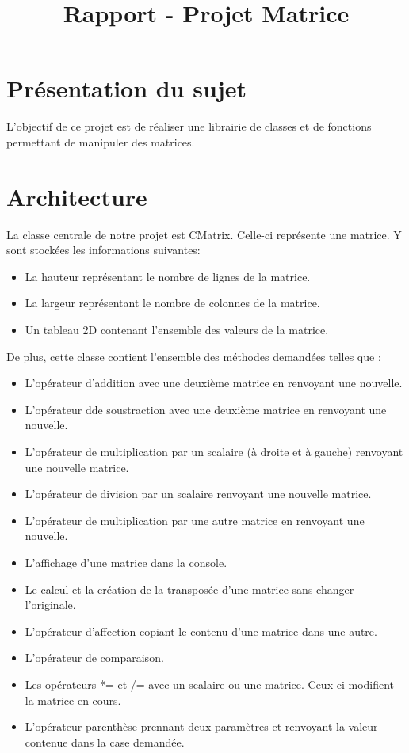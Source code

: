 
\title{Rapport - Projet Matrice}
\fancyhf{}
\lhead{\leftmark}


	\maketitle
	\tableofcontents
	\chapter{Présentation du sujet}
		L'objectif de ce projet est de réaliser une librairie de classes et de fonctions permettant de manipuler des matrices.
	
	\chapter{Architecture}
		La classe centrale de notre projet est CMatrix. Celle-ci représente une matrice. Y sont stockées les informations suivantes:
		\begin{itemize}
			\item La hauteur représentant le nombre de lignes de la matrice.
			\item La largeur représentant le nombre de colonnes de la matrice.
			\item Un tableau 2D contenant l'ensemble des valeurs de la matrice.\\
		\end{itemize}
		De plus, cette classe contient l'ensemble des méthodes demandées telles que :
		\begin{itemize}
			\item L'opérateur d'addition avec une deuxième matrice en renvoyant une nouvelle.
			\item L'opérateur dde soustraction avec une deuxième matrice en renvoyant une nouvelle.
			\item L'opérateur de multiplication par un scalaire (à droite et à gauche) renvoyant une nouvelle matrice.
			\item L'opérateur de division par un scalaire renvoyant une nouvelle matrice.
			\item L'opérateur de multiplication par une autre matrice en renvoyant une nouvelle.
			\item L'affichage d'une matrice dans la console.
			\item Le calcul et la création de la transposée d'une matrice sans changer l'originale.
			\item L'opérateur d'affection copiant le contenu d'une matrice dans une autre.
			\item L'opérateur de comparaison.
			\item Les opérateurs *= et /= avec un scalaire ou une matrice. Ceux-ci modifient la matrice en cours.
			\item L'opérateur parenthèse prennant deux paramètres et renvoyant la valeur contenue dans la case demandée.\\
		\end{itemize}
		

